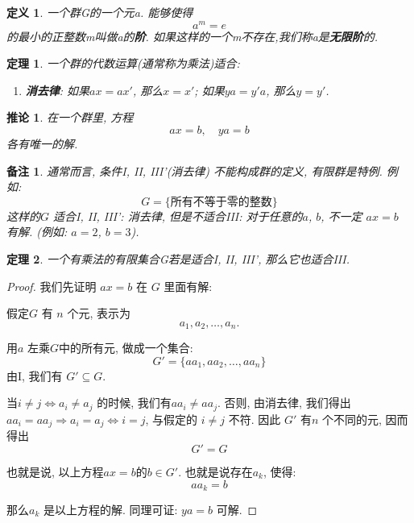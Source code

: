 \documentclass[utf8]{ctexbook}
\newtheorem{theorem}{定理}[section]
\newtheorem{definition}{定义}[section]
\newtheorem{memo}{备注}[section]
\newtheorem{corollary}{推论}[section]
\begin{document}
\begin{definition}
一个群G的一个元a. 能够使得
\begin{equation}
a^m = e
\end{equation}
的最小的正整数m叫做a的\textbf{阶}. 如果这样的一个m不存在,我们称a是\textbf{无限阶}的.
\end{definition}

\begin{theorem}
一个群的代数运算(通常称为乘法)适合:
\begin{enumerate}
\item[III']{\textbf{消去律}: 如果$ax = a x'$, 那么$x = x'$; 如果$ya = y' a $, 那么$y = y'$.}
\end{enumerate}
\end{theorem}

\begin{corollary}
在一个群里, 方程
\begin{equation}
ax = b, \quad y a = b
\end{equation}
各有唯一的解.
\end{corollary}

\begin{memo}
通常而言, 条件I, II, III'(消去律) 不能构成群的定义, 有限群是特例. 例如: 
\begin{equation}
G = \{ \mbox{所有不等于零的整数} \}
\end{equation}
这样的$G$ 适合I, II, III': 消去律, 但是不适合III: 对于任意的$a$, $b$, 不一定 $ax=b$ 有解. (例如: $a=2$, $b=3$).

\end{memo}

\begin{theorem}
一个有乘法的有限集合G若是适合I, II, III', 那么它也适合III.
\end{theorem}

\begin{proof}
我们先证明 $ax = b$ 在 $G$ 里面有解:

假定$G$ 有 $n$ 个元, 表示为
\begin{equation}
a_1, a_2, \ldots, a_n .
\end{equation}

用$a$ 左乘$G$中的所有元, 做成一个集合:
\begin{equation}
G' = \{ a a_1, a a_2, \ldots, a a_n \}
\end{equation}
由I, 我们有 $G' \subseteq G$.

当$i \neq j \iff a_i \neq a_j$ 的时候, 我们有$a a_i \neq a a_j$. 否则, 由消去律, 我们得出$a a_i = a a_j \Rightarrow a_i = a_j \iff i = j$, 与假定的 $i \neq j $ 不符. 因此 $G'$ 有$n$ 个不同的元, 因而得出
\begin{equation}
G' = G
\end{equation}

也就是说, 以上方程$ax=b$的$b \in G'$. 也就是说存在$a_k$, 使得:
\begin{equation}
a a_k = b
\end{equation}

那么$a_k$ 是以上方程的解.  同理可证: $ya = b$ 可解. 
\end{proof}
\end{document}
